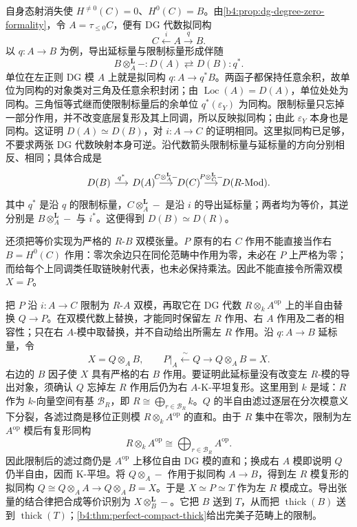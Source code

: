 \begin{proofsketch}
	自身态射消失使 \(H^{\ne0}(C)=0\)、\(H^0(C)=B\)。由\cref{b4:prop:dg-degree-zero-formality}，令 \(A=\tau_{\le0}C\)，便有 DG 代数拟同构
	\[
		C\xleftarrow{\ i\ } A\xrightarrow{\ q\ } B.
	\]
	以 \(q:A\to B\) 为例，导出延标量与限制标量形成伴随
	\[
		B\otimes_A^{\mathbf L}-:D(A)\rightleftarrows D(B):q^*.
	\]
	单位在左正则 DG 模 \(A\) 上就是拟同构 \(q:A\to q^*B\)。两函子都保持任意余积，故单位为同构的对象类对三角及任意余积封闭；由 \(\operatorname{Loc}(A)=D(A)\)，单位处处为同构。三角恒等式继而使限制标量后的余单位 \(q^*(\varepsilon_Y)\) 为同构。限制标量只忘掉一部分作用，并不改变底层复形及其上同调，所以反映拟同构；由此 \(\varepsilon_Y\) 本身也是同构。这证明 \(D(A)\simeq D(B)\)，对 \(i:A\to C\) 的证明相同。这里拟同构已足够，不要求两张 DG 代数映射本身可逆。沿代数箭头限制标量与延标量的方向分别相反、相同；具体合成是
	\[
		\begin{tikzcd}[column sep=1.4em]
			D(B)\arrow[r,"q^*"]&D(A)\arrow[r,"C\otimes_A^{\mathbf L}-"]&D(C)\arrow[r,"P\otimes_C^{\mathbf L}-"]&D(R\text{-}\mathrm{Mod}).
		\end{tikzcd}
	\]
	其中 \(q^*\) 是沿 \(q\) 的限制标量，\(C\otimes_A^{\mathbf L}-\) 是沿 \(i\) 的导出延标量；两者均为等价，其逆分别是 \(B\otimes_A^{\mathbf L}-\) 与 \(i^*\)。这便得到 \(D(B)\simeq D(R)\)。

	还须把等价实现为严格的 \(R\)-\(B\) 双模张量。\(P\) 原有的右 \(C\) 作用不能直接当作右 \(B=H^0(C)\) 作用：零次余边只在同伦范畴中作用为零，未必在 \(P\) 上严格为零；而给每个上同调类任取链映射代表，也未必保持乘法。因此不能直接令所需双模 \(X=P\)。

	把 \(P\) 沿 \(i:A\to C\) 限制为 \(R\)-\(A\) 双模，再取它在 DG 代数 \(R\otimes_kA^{\mathrm{op}}\) 上的半自由替换 \(Q\to P\)。在双模代数上替换，才能同时保留左 \(R\) 作用、右 \(A\) 作用及二者的相容性；只在右 \(A\)-模中取替换，并不自动给出所需左 \(R\) 作用。沿 \(q:A\to B\) 延标量，令
	\[
		X=Q\otimes_A B,\qquad P|_A\xleftarrow{\ \sim\ }Q\longrightarrow Q\otimes_A B=X.
	\]
	右边的 \(B\) 因子使 \(X\) 具有严格的右 \(B\) 作用。要证明此延标量没有改变左 \(R\)-模的导出对象，须确认 \(Q\) 忘掉左 \(R\) 作用后仍为右 \(A\)-K-平坦复形。这里用到 \(k\) 是域：\(R\) 作为 \(k\)-向量空间有基 \(\mathcal B_R\)，即 \(R\cong\bigoplus_{r\in\mathcal B_R}k\)。\(Q\) 的半自由滤过逐层在分次模意义下分裂，各滤过商是移位正则模 \(R\otimes_kA^{\mathrm{op}}\) 的直和。由于 \(R\) 集中在零次，限制为左 \(A^{\mathrm{op}}\) 模后有复形同构
	\[
		R\otimes_kA^{\mathrm{op}} \cong\bigoplus_{r\in\mathcal B_R}A^{\mathrm{op}}.
	\]
	因此限制后的滤过商仍是 \(A^{\mathrm{op}}\) 上移位自由 DG 模的直和；换成右 \(A\) 模即说明 \(Q\) 仍半自由，因而 K-平坦。将 \(Q\otimes_A-\) 作用于拟同构 \(A\to B\)，得到左 \(R\) 模复形的拟同构 \(Q\cong Q\otimes_AA\to Q\otimes_AB=X\)。于是 \(X\simeq P\simeq T\) 作为左 \(R\) 模成立。导出张量的结合律把合成等价识别为 \(X\otimes_B^{\mathbf L}-\)。它把 \(B\) 送到 \(T\)，从而把 \(\operatorname{thick}(B)\) 送到 \(\operatorname{thick}(T)\)；\cref{b4:thm:perfect-compact-thick}给出完美子范畴上的限制。


\end{proofsketch}
